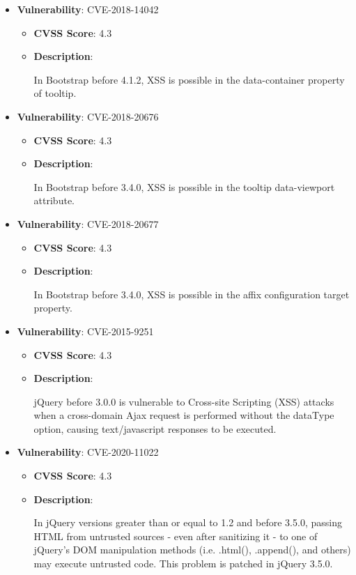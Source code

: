 \documentclass{article}
\begin{document}
\begin{itemize}
        \item \textbf{Vulnerability}: CVE-2018-14042
        \begin{itemize}
            \item \textbf{CVSS Score}:  4.3 
            \item \textbf{Description}:
            \parbox[t]{0.9\linewidth}{
                \ttfamily In Bootstrap before 4.1.2, XSS is possible in the data-container property of tooltip.
            }
        \end{itemize}
    
        \item \textbf{Vulnerability}: CVE-2018-20676
        \begin{itemize}
            \item \textbf{CVSS Score}:  4.3 
            \item \textbf{Description}:
            \parbox[t]{0.9\linewidth}{
                \ttfamily In Bootstrap before 3.4.0, XSS is possible in the tooltip data-viewport attribute.
            }
        \end{itemize}
    
        \item \textbf{Vulnerability}: CVE-2018-20677
        \begin{itemize}
            \item \textbf{CVSS Score}:  4.3 
            \item \textbf{Description}:
            \parbox[t]{0.9\linewidth}{
                \ttfamily In Bootstrap before 3.4.0, XSS is possible in the affix configuration target property.
            }
        \end{itemize}
    
        \item \textbf{Vulnerability}: CVE-2015-9251
        \begin{itemize}
            \item \textbf{CVSS Score}:  4.3 
            \item \textbf{Description}:
            \parbox[t]{0.9\linewidth}{
                \ttfamily jQuery before 3.0.0 is vulnerable to Cross-site Scripting (XSS) attacks when a cross-domain Ajax request is performed without the dataType option, causing text/javascript responses to be executed.
            }
        \end{itemize}
    
        \item \textbf{Vulnerability}: CVE-2020-11022
        \begin{itemize}
            \item \textbf{CVSS Score}:  4.3 
            \item \textbf{Description}:
            \parbox[t]{0.9\linewidth}{
                \ttfamily In jQuery versions greater than or equal to 1.2 and before 3.5.0, passing HTML from untrusted sources - even after sanitizing it - to one of jQuery's DOM manipulation methods (i.e. .html(), .append(), and others) may execute untrusted code. This problem is patched in jQuery 3.5.0.
            }
        \end{itemize}
    

\end{itemize}
\end{document}
